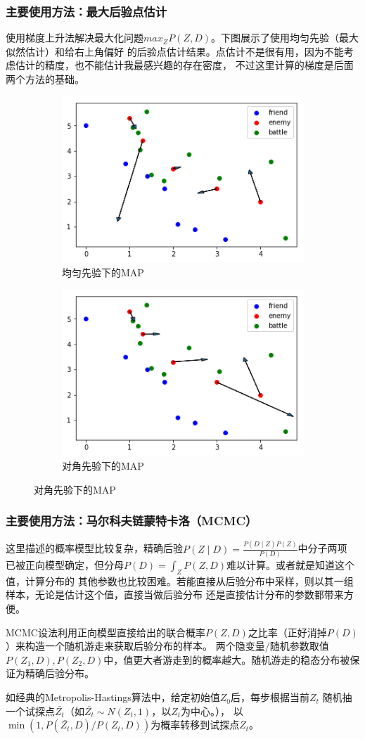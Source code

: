 \documentclass{beamer}
\begin{document}
\begin{frame}

\frametitle{主要使用方法：最大后验点估计}

使用梯度上升法解决最大化问题$max_Z P(Z,D)$。下图展示了使用均匀先验（最大似然估计）和给右上角偏好
的后验点估计结果。点估计不是很有用，因为不能考虑估计的精度，也不能估计我最感兴趣的存在密度，
不过这里计算的梯度是后面两个方法的基础。

\begin{figure}[htb]
  \begin{subfigure}[b]{0.49\linewidth}
    \includegraphics[width=0.6\linewidth]{MAP1.png}
    \caption{均匀先验下的MAP}
  \end{subfigure}
  \begin{subfigure}[b]{0.49\linewidth}
    \includegraphics[width=0.6\linewidth]{MAP2.png}
    \caption{对角先验下的MAP}
  \end{subfigure}
\end{figure}

\end{frame}

\begin{frame}

\frametitle{主要使用方法：马尔科夫链蒙特卡洛（MCMC）}

这里描述的概率模型比较复杂，精确后验$P(Z \mid D) = \frac{P(D \mid Z)P(Z)}{P(D)}$中分子两项
已被正向模型确定，但分母$P(D) = \int_Z P(Z,D)$难以计算。或者就是知道这个值，计算分布的
其他参数也比较困难。若能直接从后验分布中采样，则以其一组样本，无论是估计这个值，直接当做后验分布
还是直接估计分布的参数都带来方便。

MCMC设法利用正向模型直接给出的联合概率$P(Z,D)$之比率（正好消掉$P(D)$）来构造一个随机游走来获取后验分布的样本。
两个隐变量/随机参数取值$P(Z_1,D),P(Z_2,D)$中，值更大者游走到的概率越大。随机游走的稳态分布被保证为精确后验分布。

如经典的Metropolis-Hastings算法中，给定初始值$Z_0$后，每步根据当前$Z_t$
随机抽一个试探点$\bar{Z_t}$（如$\bar{Z_t} \sim N(Z_t,1)$，以$Z_t$为中心。），
以$\min(1,P(\bar{Z_t},D)/P(Z_t,D))$为概率转移到试探点$Z_t$。

\end{frame}
\end{document}

